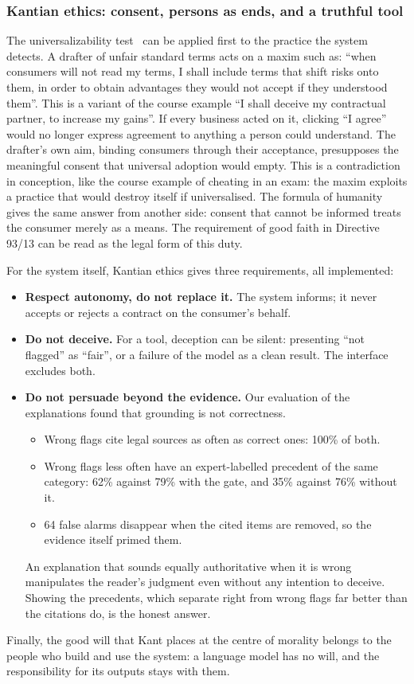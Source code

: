 \subsubsection{Kantian ethics: consent, persons as ends, and a truthful tool}
\label{sec:ethics-kant}

The universalizability test~\citep{kant1785,slides_deontology} can be applied first to the practice the system detects. A drafter of unfair standard terms acts on a maxim such as: ``when consumers will not read my terms, I shall include terms that shift risks onto them, in order to obtain advantages they would not accept if they understood them''. This is a variant of the course example ``I shall deceive my contractual partner, to increase my gains''. If every business acted on it, clicking ``I agree'' would no longer express agreement to anything a person could understand. The drafter's own aim, binding consumers through their acceptance, presupposes the meaningful consent that universal adoption would empty. This is a contradiction in conception, like the course example of cheating in an exam: the maxim exploits a practice that would destroy itself if universalised. The formula of humanity gives the same answer from another side: consent that cannot be informed treats the consumer merely as a means. The requirement of good faith in Directive 93/13 can be read as the legal form of this duty.

For the system itself, Kantian ethics gives three requirements, all implemented:
\begin{itemize}
  \item \textbf{Respect autonomy, do not replace it.} The system informs; it never accepts or rejects a contract on the consumer's behalf.
  \item \textbf{Do not deceive.} For a tool, deception can be silent: presenting ``not flagged'' as ``fair'', or a failure of the model as a clean result. The interface excludes both.
  \item \textbf{Do not persuade beyond the evidence.} Our evaluation of the explanations found that grounding is not correctness.
    \begin{itemize}
      \item Wrong flags cite legal sources as often as correct ones: 100\% of both.
      \item Wrong flags less often have an expert-labelled precedent of the same category: 62\% against 79\% with the gate, and 35\% against 76\% without it.
      \item 64 false alarms disappear when the cited items are removed, so the evidence itself primed them.
    \end{itemize}
    An explanation that sounds equally authoritative when it is wrong manipulates the reader's judgment even without any intention to deceive. Showing the precedents, which separate right from wrong flags far better than the citations do, is the honest answer.
\end{itemize}
Finally, the good will that Kant places at the centre of morality belongs to the people who build and use the system: a language model has no will, and the responsibility for its outputs stays with them.

